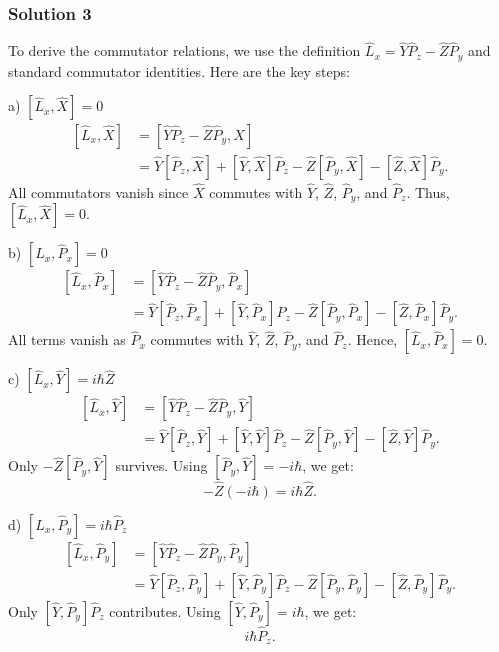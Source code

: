 \documentclass{article}
\begin{document}
\subsubsection{Solution 3}
To derive the commutator relations, we use the definition $\hat{L}_x = \hat{Y}\hat{P}_z - \hat{Z}\hat{P}_y$ and standard commutator identities. Here are the key steps:

a) $\left[\hat{L}_x, \hat{X}\right] = 0$
\begin{align*}
\left[\hat{L}_x, \hat{X}\right] &= \left[\hat{Y}\hat{P}_z - \hat{Z}\hat{P}_y, \hat{X}\right] \\
&= \hat{Y}\left[\hat{P}_z, \hat{X}\right] + \left[\hat{Y}, \hat{X}\right]\hat{P}_z - \hat{Z}\left[\hat{P}_y, \hat{X}\right] - \left[\hat{Z}, \hat{X}\right]\hat{P}_y.
\end{align*}
All commutators vanish since $\hat{X}$ commutes with $\hat{Y}$, $\hat{Z}$, $\hat{P}_y$, and $\hat{P}_z$. Thus, $\left[\hat{L}_x, \hat{X}\right] = 0$.

b) $\left[\hat{L}_x, \hat{P}_x\right] = 0$
\begin{align*}
\left[\hat{L}_x, \hat{P}_x\right] &= \left[\hat{Y}\hat{P}_z - \hat{Z}\hat{P}_y, \hat{P}_x\right] \\
&= \hat{Y}\left[\hat{P}_z, \hat{P}_x\right] + \left[\hat{Y}, \hat{P}_x\right]\hat{P}_z - \hat{Z}\left[\hat{P}_y, \hat{P}_x\right] - \left[\hat{Z}, \hat{P}_x\right]\hat{P}_y.
\end{align*}
All terms vanish as $\hat{P}_x$ commutes with $\hat{Y}$, $\hat{Z}$, $\hat{P}_y$, and $\hat{P}_z$. Hence, $\left[\hat{L}_x, \hat{P}_x\right] = 0$.

c) $\left[\hat{L}_x, \hat{Y}\right] = i\hbar \hat{Z}$
\begin{align*}
\left[\hat{L}_x, \hat{Y}\right] &= \left[\hat{Y}\hat{P}_z - \hat{Z}\hat{P}_y, \hat{Y}\right] \\
&= \hat{Y}\left[\hat{P}_z, \hat{Y}\right] + \left[\hat{Y}, \hat{Y}\right]\hat{P}_z - \hat{Z}\left[\hat{P}_y, \hat{Y}\right] - \left[\hat{Z}, \hat{Y}\right]\hat{P}_y.
\end{align*}
Only $-\hat{Z}\left[\hat{P}_y, \hat{Y}\right]$ survives. Using $\left[\hat{P}_y, \hat{Y}\right] = -i\hbar$, we get:
\[
-\hat{Z}(-i\hbar) = i\hbar \hat{Z}.
\]

d) $\left[\hat{L}_x, \hat{P}_y\right] = i\hbar \hat{P}_z$
\begin{align*}
\left[\hat{L}_x, \hat{P}_y\right] &= \left[\hat{Y}\hat{P}_z - \hat{Z}\hat{P}_y, \hat{P}_y\right] \\
&= \hat{Y}\left[\hat{P}_z, \hat{P}_y\right] + \left[\hat{Y}, \hat{P}_y\right]\hat{P}_z - \hat{Z}\left[\hat{P}_y, \hat{P}_y\right] - \left[\hat{Z}, \hat{P}_y\right]\hat{P}_y.
\end{align*}
Only $\left[\hat{Y}, \hat{P}_y\right]\hat{P}_z$ contributes. Using $\left[\hat{Y}, \hat{P}_y\right] = i\hbar$, we get:
\[
i\hbar \hat{P}_z.
\]
\end{document}
